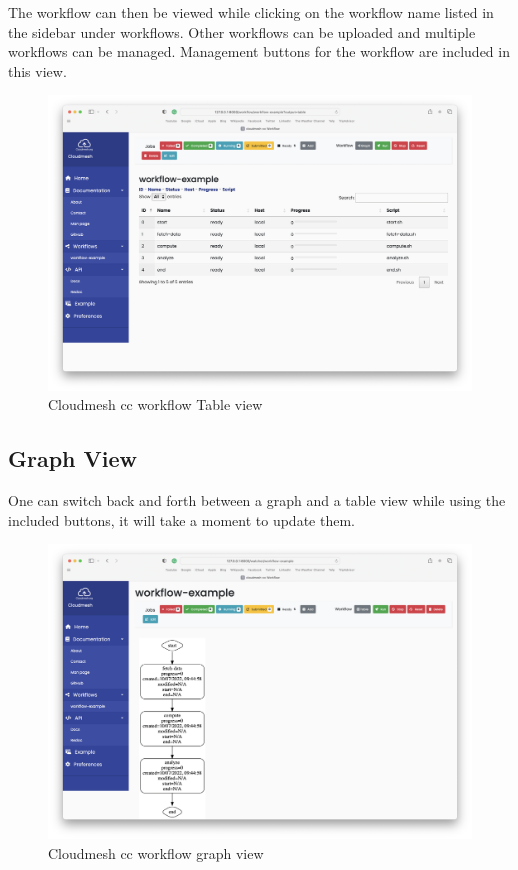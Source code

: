 The workflow can then be viewed while clicking on the workflow name
listed in the sidebar under workflows. Other workflows can be uploaded
and multiple workflows can be managed. Management buttons for the
workflow are included in this view.

\begin{figure}
\centering
\includegraphics[width=1.05\columnwidth]{images/service-table.png}
\caption{Cloudmesh cc workflow Table view}
\end{figure}

\subsection{Graph View}\label{graph-view}

One can switch back and forth between a graph and a table view while
using the included buttons, it will take a moment to update them.

\begin{figure}
\centering
\includegraphics[width=1.05\columnwidth]{images/service-graph.png}
\caption{Cloudmesh cc workflow graph view}
\end{figure}
